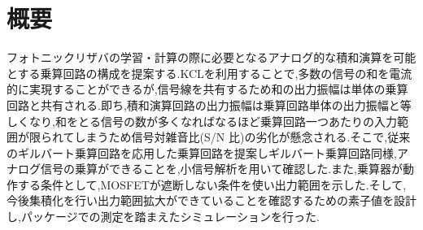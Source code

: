 \chapter*{概要}
フォトニックリザバの学習・計算の際に必要となるアナログ的な積和演算を可能とする乗算回路の構成を提案する.KCLを利用することで,多数の信号の和を電流的に実現することができるが,信号線を共有するため和の出力振幅は単体の乗算回路と共有される.即ち,積和演算回路の出力振幅は乗算回路単体の出力振幅と等しくなり,和をとる信号の数が多くなればなるほど乗算回路一つあたりの入力範囲が限られてしまうため信号対雑音比(S/N 比)の劣化が懸念される.そこで,従来のギルバート乗算回路を応用した乗算回路を提案しギルバート乗算回路同様,アナログ信号の乗算ができることを,小信号解析を用いて確認した.また,乗算器が動作する条件として,MOSFETが遮断しない条件を使い出力範囲を示した.そして,今後集積化を行い出力範囲拡大ができていることを確認するための素子値を設計し,パッケージでの測定を踏まえたシミュレーションを行った.
